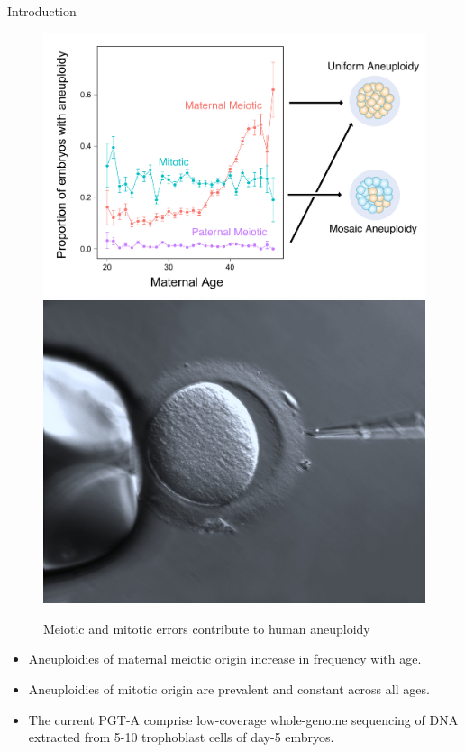 \documentclass[final]{beamer}
\newlength{\colwidth}
\begin{document}
\begin{frame}[t]
\begin{columns}[t]
\begin{column}{\colwidth}
\begin{block}{Introduction}
    \begin{figure}
      \centering
           \includegraphics[width=0.59\linewidth,align=c]{figures/BPH_and_SPH_errors_vs_maternal_age.pdf}
           \includegraphics[width=0.4\linewidth,align=c]{figures/Oocyte_with_Zona_pellucida_(27771482282)_original.jpg}

      \caption{Meiotic and mitotic errors contribute to human aneuploidy}
    \end{figure}
    \begin{itemize}
 

       \item Aneuploidies of maternal meiotic origin increase in frequency with age.
        \item Aneuploidies of mitotic origin are prevalent and constant across all ages. 
     \item The current PGT-A comprise low-coverage whole-genome sequencing of DNA extracted from 5-10 trophoblast cells of day-5 embryos.
    \end{itemize}
    


\end{block}
\end{column}
\end{columns}
\end{frame}
\end{document}
